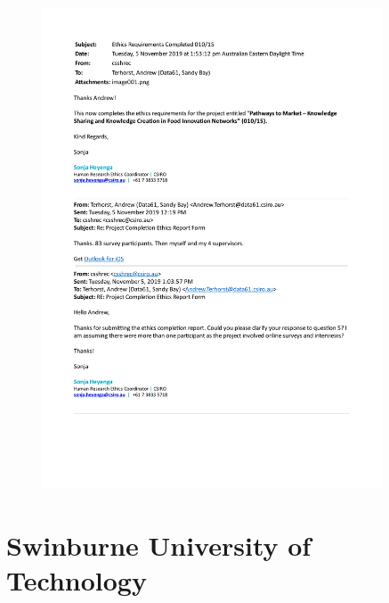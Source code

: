 \begin{figure}[hbt!]
    \centering
    \includegraphics[width = 0.9\textwidth]{Images/CSSHREC_010_15_FINAL.pdf}
    \caption[Evidence of ethics conclusion -- CSIRO]{}
    \label{fig:csiro_ethics_approval}
\end{figure}

\newpage

\section{Swinburne University of Technology}

